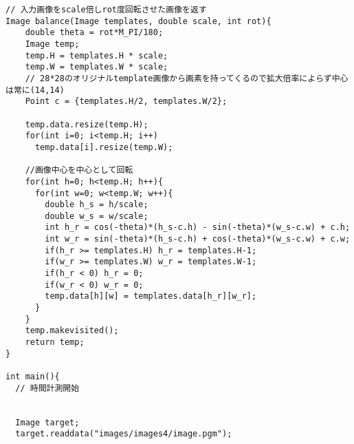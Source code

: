 \begin{lstlisting}[basicstyle=\ttfamily\footnotesize, frame=single]
// 入力画像をscale倍しrot度回転させた画像を返す
Image balance(Image templates, double scale, int rot){
    double theta = rot*M_PI/180;
    Image temp;
    temp.H = templates.H * scale;
    temp.W = templates.W * scale;
    // 28*28のオリジナルtemplate画像から画素を持ってくるので拡大倍率によらず中心は常に(14,14)
    Point c = {templates.H/2, templates.W/2};

    temp.data.resize(temp.H);
    for(int i=0; i<temp.H; i++)
      temp.data[i].resize(temp.W);

    //画像中心を中心として回転
    for(int h=0; h<temp.H; h++){
      for(int w=0; w<temp.W; w++){
        double h_s = h/scale;
        double w_s = w/scale;
        int h_r = cos(-theta)*(h_s-c.h) - sin(-theta)*(w_s-c.w) + c.h;
        int w_r = sin(-theta)*(h_s-c.h) + cos(-theta)*(w_s-c.w) + c.w;
        if(h_r >= templates.H) h_r = templates.H-1;
        if(w_r >= templates.W) w_r = templates.W-1;
        if(h_r < 0) h_r = 0;
        if(w_r < 0) w_r = 0;
        temp.data[h][w] = templates.data[h_r][w_r];
      }
    }
    temp.makevisited();
    return temp;
}

int main(){
  // 時間計測開始


  Image target;
  target.readdata("images/images4/image.pgm");
  

\end{lstlisting}
